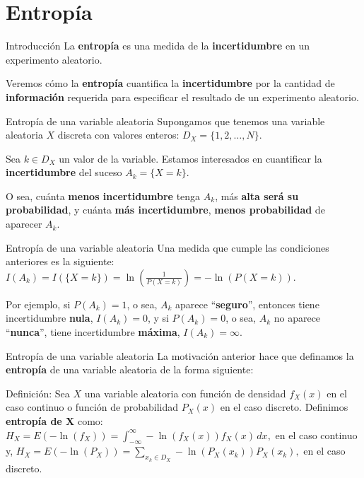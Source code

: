 \documentclass[
  ignorenonframetext,
  aspectratio=169]{beamer}
\begin{document}
\hypertarget{entropuxeda}{%
\section{Entropía}\label{entropuxeda}}

\begin{frame}{Introducción}
\protect\hypertarget{introducciuxf3n-3}{}
La \textbf{entropía} es una medida de la \textbf{incertidumbre} en un
experimento aleatorio.

Veremos cómo la \textbf{entropía} cuantifica la \textbf{incertidumbre}
por la cantidad de \textbf{información} requerida para especificar el
resultado de un experimento aleatorio.
\end{frame}

\begin{frame}{Entropía de una variable aleatoria}
\protect\hypertarget{entropuxeda-de-una-variable-aleatoria}{}
Supongamos que tenemos una variable aleatoria \(X\) discreta con valores
enteros: \(D_X=\{1,2,\ldots,N\}\).

Sea \(k\in D_X\) un valor de la variable. Estamos interesados en
cuantificar la \textbf{incertidumbre} del suceso \(A_k =\{X=k\}\).

O sea, cuánta \textbf{menos incertidumbre} tenga \(A_k\), más
\textbf{alta será su probabilidad}, y cuánta \textbf{más incertidumbre},
\textbf{menos probabilidad} de aparecer \(A_k\).
\end{frame}

\begin{frame}{Entropía de una variable aleatoria}
\protect\hypertarget{entropuxeda-de-una-variable-aleatoria-1}{}
Una medida que cumple las condiciones anteriores es la siguiente:
\(I(A_k)=I(\{X=k\})=\ln\left(\frac{1}{P(X=k)}\right)=-\ln\left(P(X=k)\right).\)

Por ejemplo, si \(P(A_k)=1\), o sea, \(A_k\) aparece
``\textbf{seguro}'', entonces tiene incertidumbre \textbf{nula},
\(I(A_k)=0\), y si \(P(A_k)=0\), o sea, \(A_k\) no aparece
``\textbf{nunca}'', tiene incertidumbre \textbf{máxima},
\(I(A_k)=\infty\).
\end{frame}

\begin{frame}{Entropía de una variable aleatoria}
\protect\hypertarget{entropuxeda-de-una-variable-aleatoria-2}{}
La motivación anterior hace que definamos la \textbf{entropía} de una
variable aleatoria de la forma siguiente:

Definición: Sea \(X\) una variable aleatoria con función de densidad
\(f_X(x)\) en el caso continuo o función de probabilidad \(P_X(x)\) en
el caso discreto. Definimos \textbf{entropía de X} como:
\(H_X = E\left(-\ln(f_X)\right)=\int_{-\infty}^\infty -\ln(f_X(x)) f_X(x)\, dx,\)
en el caso continuo y,
\(H_X = E\left(-\ln(P_X)\right)=\sum_{x_k\in D_X} -\ln(P_X(x_k)) P_X(x_k),\)
en el caso discreto.
\end{frame}
\end{document}
